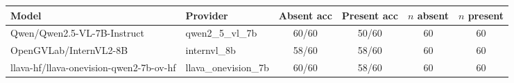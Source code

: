 \begin{tabular}{llcccc}
\toprule
Model & Provider & Absent acc & Present acc & $n$ absent & $n$ present \\
\midrule
Qwen/Qwen2.5-VL-7B-Instruct & qwen2\_5\_vl\_7b & 60/60 & 50/60 & 60 & 60 \\
OpenGVLab/InternVL2-8B & internvl\_8b & 58/60 & 58/60 & 60 & 60 \\
llava-hf/llava-onevision-qwen2-7b-ov-hf & llava\_onevision\_7b & 60/60 & 58/60 & 60 & 60 \\
\bottomrule
\end{tabular}
